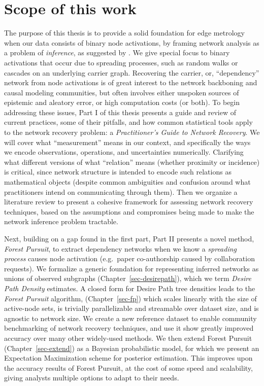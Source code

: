 \documentclass[%
	12pt,
		oneside,
		letterpaper
]{book}
\begin{document}
\section{Scope of this work}\label{scope-of-this-work}

The purpose of this thesis is to provide a solid foundation for edge
metrology when our data consists of binary node activations, by framing
network analysis as a problem of \emph{inference}, as suggested by
\textcite{Statisticalinferencelinks_Peel2022}. We give special focus to
binary activations that occur due to spreading processes, such as random
walks or cascades on an underlying carrier graph. Recovering the
carrier, or, ``dependency'' network from node activations is of great
interest to the network backboning and causal modeling communities, but
often involves either unspoken sources of epistemic and aleatory error,
or high computation costs (or both). To begin addressing these issues,
Part I of this thesis presents a guide and review of current practices,
some of their pitfalls, and how common statistical tools apply to the
network recovery problem: a \emph{Practitioner's Guide to Network
Recovery}. We will cover what ``measurement'' means in our context, and
specifically the ways we encode observations, operations, and
uncertainties numerically. Clarifying what different versions of what
``relation'' means (whether proximity or incidence) is critical, since
network structure is intended to encode such relations as mathematical
objects (despite common ambiguities and confusion around what
practitioners intend on communicating through them). Then we organize a
literature review to present a cohesive framework for assessing network
recovery techniques, based on the assumptions and compromises being made
to make the network inference problem tractable.

Next, building on a gap found in the first part, Part II presents a
novel method, \emph{Forest Pursuit}, to extract dependency networks when
we know a \emph{spreading process} causes node activation (e.g.~paper
co-authorship caused by collaboration requests). We formalize a generic
foundation for representing inferred networks as unions of observed
subgraphs (Chapter~\ref{sec-desirepath}), which we term \emph{Desire
Path Density} estimates. A closed form for Desire Path tree densities
leads to the \emph{Forest Pursuit} algorithm, (Chapter~\ref{sec-fp})
which scales linearly with the size of active-node sets, is trivially
parallelizable and streamable over dataset size, and is agnostic to
network size. We create a new reference dataset to enable community
benchmarking of network recovery techniques, and use it show greatly
improved accuracy over many other widely-used methods. We then extend
Forest Pursuit (Chapter~\ref{sec-extend}) as a Bayesian probabilistic
model, for which we present an Expectation Maximization scheme for
posterior estimation. This improves upon the accuracy results of Forest
Pursuit, at the cost of some speed and scalability, giving analysts
multiple options to adapt to their needs.
\end{document}
